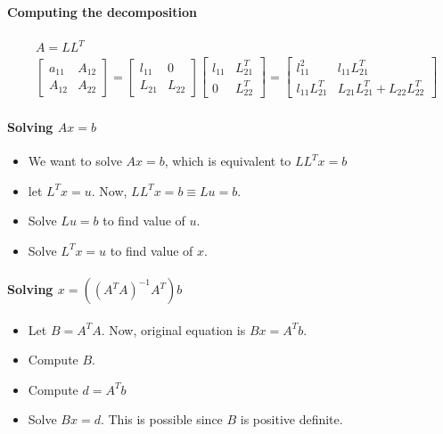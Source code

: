 \documentclass[11pt]{book}
\begin{document}
\paragraph{Computing the decomposition}
\begin{align*}
    &A = L L^T\\
    &\begin{bmatrix} a_{11} & A_{12} \\ A_{12} & A_{22} \end{bmatrix} = 
    \begin{bmatrix} l_{11} & 0 \\ L_{21} & L_{22} \end{bmatrix}
    \begin{bmatrix} l_{11} & L_{21}^T \\ 0 & L_{22}^T \end{bmatrix}  = 
%
    \begin{bmatrix}
        l_{11}^2 & l_{11} L_{21}^T \\ l_{11} L_{21}^T & L_{21} L_{21}^T + L_{22} L_{22}^T
    \end{bmatrix}
\end{align*}

\paragraph{Solving $Ax = b$}
\begin{itemize}
    \item We want to solve $Ax = b$, which is equivalent to $LL^Tx = b$
    \item let $L^Tx  = u$. Now, $LL^T x = b \equiv Lu = b$.
    \item Solve $Lu = b$ to find value of $u$.
    \item Solve $L^Tx = u$ to find value of $x$.
\end{itemize}

\paragraph{Solving $x = ((A^TA)^{-1}A^T)b$}
\begin{itemize}
    \item Let $B = A^TA$. Now, original equation is $Bx = A^T b$.
    \item Compute $B$.
    \item Compute $d = A^Tb$
    \item Solve $Bx = d$. This is possible since $B$ is positive definite.
\end{itemize}
\end{document}
